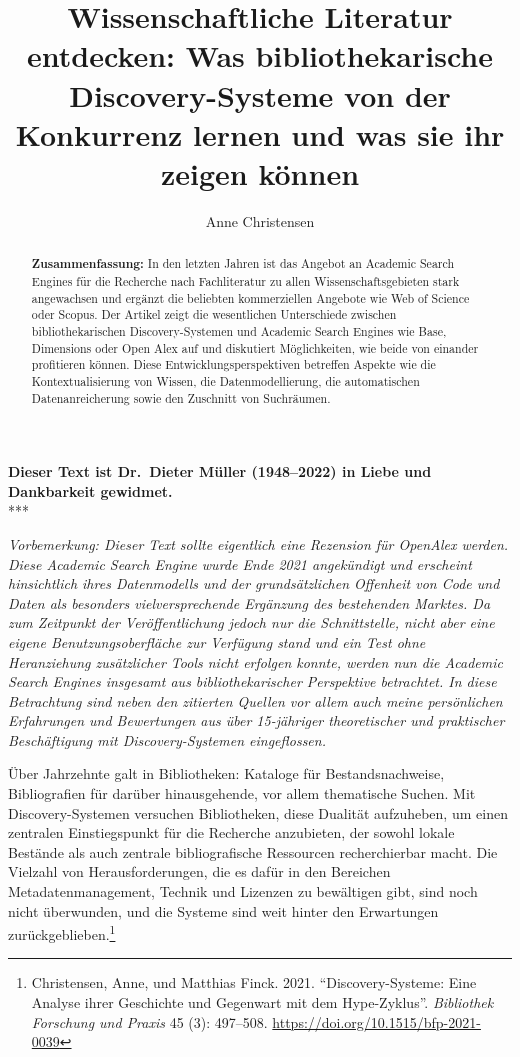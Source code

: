 \documentclass[a4paper,
fontsize=11pt,
oneside,
numbers=noperiodatend,
parskip=half-,
bibliography=totoc,
final
]{scrartcl}
\title{\LARGE{Wissenschaftliche Literatur entdecken: Was bibliothekarische Discovery-Systeme von der Konkurrenz lernen und was sie ihr zeigen können}}%
\author{Anne Christensen} %
\date{}
\begin{document}
\maketitle
\thispagestyle{fancyplain} 

\begin{abstract}
\noindent
\textbf{Zusammenfassung:} In den letzten Jahren ist das Angebot an
Academic Search Engines für die Recherche nach Fachliteratur zu allen
Wissenschaftsgebieten stark angewachsen und ergänzt die beliebten
kommerziellen Angebote wie Web of Science oder Scopus. Der Artikel zeigt
die wesentlichen Unterschiede zwischen bibliothekarischen
Discovery-Systemen und Academic Search Engines wie Base, Dimensions oder
Open Alex auf und diskutiert Möglichkeiten, wie beide von einander
profitieren können. Diese Entwicklungsperspektiven betreffen Aspekte wie
die Kontextualisierung von Wissen, die Datenmodellierung, die
automatischen Datenanreicherung sowie den Zuschnitt von Suchräumen.
\end{abstract}

\begin{center}
\textbf{Dieser Text ist Dr.~Dieter Müller (1948--2022) in Liebe und
Dankbarkeit gewidmet.} \\
\vspace{.5em}***
\end{center}

\emph{Vorbemerkung: Dieser Text sollte eigentlich eine Rezension für
OpenAlex werden. Diese Academic Search Engine wurde Ende 2021
angekündigt und erscheint hinsichtlich ihres Datenmodells und der
grundsätzlichen Offenheit von Code und Daten als besonders
vielversprechende Ergänzung des bestehenden Marktes. Da zum Zeitpunkt
der Veröffentlichung jedoch nur die Schnittstelle, nicht aber eine
eigene Benutzungsoberfläche zur Verfügung stand und ein Test ohne
Heranziehung zusätzlicher Tools nicht erfolgen konnte, werden nun die
Academic Search Engines insgesamt aus bibliothekarischer Perspektive
betrachtet. In diese Betrachtung sind neben den zitierten Quellen vor
allem auch meine persönlichen Erfahrungen und Bewertungen aus über
15-jähriger theoretischer und praktischer Beschäftigung mit
Discovery-Systemen eingeflossen.}

Über Jahrzehnte galt in Bibliotheken: Kataloge für Bestandsnachweise,
Bibliografien für darüber hinausgehende, vor allem thematische Suchen.
Mit Discovery-Systemen versuchen Bibliotheken, diese Dualität
aufzuheben, um einen zentralen Einstiegspunkt für die Recherche
anzubieten, der sowohl lokale Bestände als auch zentrale bibliografische
Ressourcen recherchierbar macht. Die Vielzahl von Herausforderungen, die
es dafür in den Bereichen Metadatenmanagement, Technik und Lizenzen zu
bewältigen gibt, sind noch nicht überwunden, und die Systeme sind weit
hinter den Erwartungen zurückgeblieben.\footnote{Christensen, Anne, und
  Matthias Finck. 2021. \enquote{Discovery-Systeme: Eine Analyse ihrer
  Geschichte und Gegenwart mit dem Hype-Zyklus}. \emph{Bibliothek
  Forschung und Praxis} 45 (3): 497--508.
  \url{https://doi.org/10.1515/bfp-2021-0039}}
\end{document}
